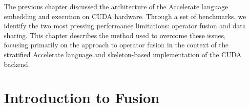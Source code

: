 % 
% 
% 

The previous chapter discussed the architecture of the Accelerate language
embedding and execution on CUDA hardware. Through a set of benchmarks, we
identify the two most pressing performance limitations: operator fusion and data
sharing. This chapter describes the method used to overcome these issues,
focusing primarily on the approach to operator fusion in the context of the
stratified Accelerate language and skeleton-based implementation of the CUDA
backend.


\section{Introduction to Fusion}

